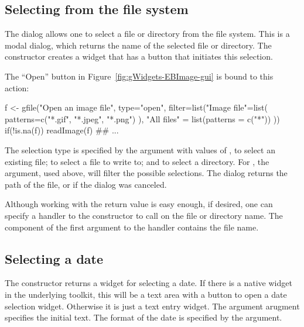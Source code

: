 \subsection{Selecting from the file system}
\label{sec:gWidgets-selecting-from-file}

The  dialog allows one to select a file or directory
from the file system. This is a modal dialog, which returns the name
of the selected file or directory. The 
constructor creates a widget that has a button that
initiates this selection.  

The ``Open'' button in Figure~\ref{fig:gWidgets-EBImage-gui} is bound
to this action:


\begin{Schunk}
\begin{Sinput}
 f <- gfile("Open an image file",
            type="open",
            filter=list("Image file"=list(
                          patterns=c("*.gif", "*.jpeg", "*.png")
                          ),
              "All files" = list(patterns = c("*"))
              ))
 if(!is.na(f)) 
   readImage(f) ## ...
\end{Sinput}
\end{Schunk}


The selection type is specified by the  argument with
values of , to select an existing file;  to
select a file to write to; and  to select a
directory. For , the  argument,
used above, will filter
the possible selections. The dialog returns the path of the
file, or  if the dialog was canceled. 

Although working with the return value is easy enough, if desired, one can specify a
handler to the constructor to call on the file or directory name. The
component  of the first argument to the handler contains
the file name.




\subsection{Selecting a date}
\label{sec:gWidgets-selecting-date}

The  constructor returns a widget for selecting
a date. If there is a native widget in the underlying toolkit, this
will be a text area with a button to open a date selection
widget. Otherwise it is just a text entry widget.  The argument
 arugment specifies the initial text. The
format of the date is specified by the 
argument.

